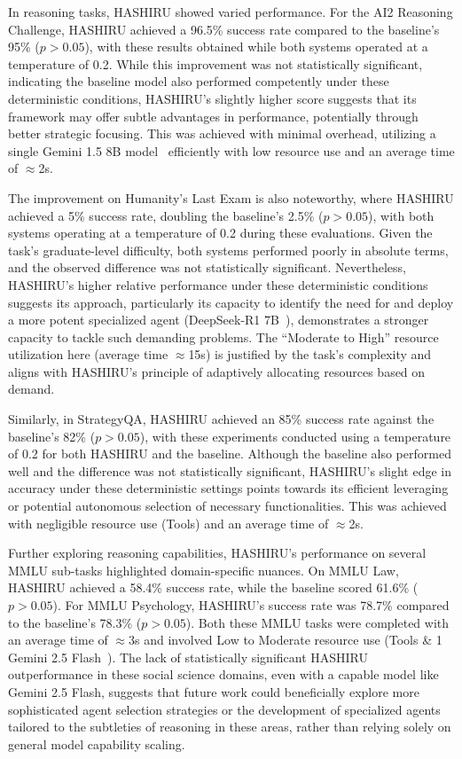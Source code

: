 \documentclass[conference]{IEEEtran}
\begin{document}
In reasoning tasks, HASHIRU showed varied performance. For the AI2 Reasoning Challenge, HASHIRU achieved a 96.5\% success rate compared to the baseline's 95\% ($p > 0.05$), with these results obtained while both systems operated at a temperature of 0.2. While this improvement was not statistically significant, indicating the baseline model also performed competently under these deterministic conditions, HASHIRU's slightly higher score suggests that its framework may offer subtle advantages in performance, potentially through better strategic focusing. This was achieved with minimal overhead, utilizing a single Gemini 1.5 8B model~\cite{gemini15flash8b} efficiently with low resource use and an average time of $\approx$2s.

The improvement on Humanity's Last Exam is also noteworthy, where HASHIRU achieved a 5\% success rate, doubling the baseline's 2.5\% ($p > 0.05$), with both systems operating at a temperature of 0.2 during these evaluations. Given the task's graduate-level difficulty, both systems performed poorly in absolute terms, and the observed difference was not statistically significant. Nevertheless, HASHIRU's higher relative performance under these deterministic conditions suggests its approach, particularly its capacity to identify the need for and deploy a more potent specialized agent (DeepSeek-R1 7B~\cite{deepseekr1_report}), demonstrates a stronger capacity to tackle such demanding problems. The ``Moderate to High'' resource utilization here (average time $\approx$15s) is justified by the task's complexity and aligns with HASHIRU's principle of adaptively allocating resources based on demand.

Similarly, in StrategyQA, HASHIRU achieved an 85\% success rate against the baseline's 82\% ($p > 0.05$), with these experiments conducted using a temperature of 0.2 for both HASHIRU and the baseline. Although the baseline also performed well and the difference was not statistically significant, HASHIRU's slight edge in accuracy under these deterministic settings points towards its efficient leveraging or potential autonomous selection of necessary functionalities. This was achieved with negligible resource use (Tools) and an average time of $\approx$2s.

Further exploring reasoning capabilities, HASHIRU's performance on several MMLU sub-tasks highlighted domain-specific nuances. On MMLU Law, HASHIRU achieved a 58.4\% success rate, while the baseline scored 61.6\% ($p > 0.05$). For MMLU Psychology, HASHIRU's success rate was 78.7\% compared to the baseline's 78.3\% ($p > 0.05$). Both these MMLU tasks were completed with an average time of $\approx$3s and involved Low to Moderate resource use (Tools \& 1 Gemini 2.5 Flash~\cite{gemini25flash}). The lack of statistically significant HASHIRU outperformance in these social science domains, even with a capable model like Gemini 2.5 Flash, suggests that future work could beneficially explore more sophisticated agent selection strategies or the development of specialized agents tailored to the subtleties of reasoning in these areas, rather than relying solely on general model capability scaling.
\end{document}
